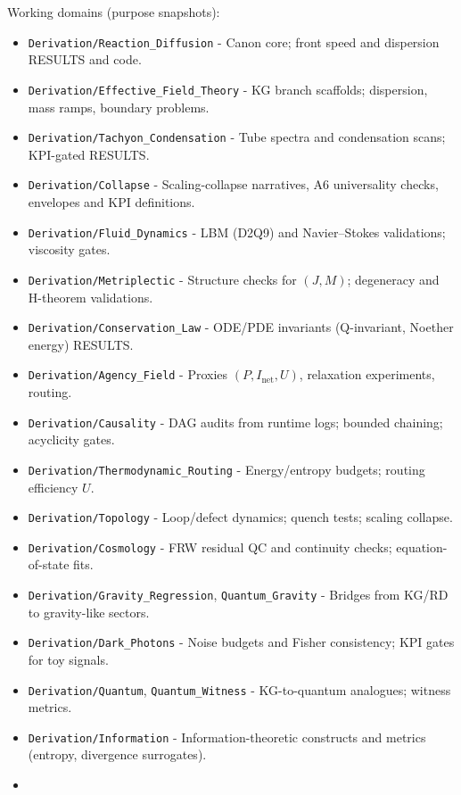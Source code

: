 \documentclass[
]{article}
\providecommand{\tightlist}{%
  \setlength{\itemsep}{0pt}\setlength{\parskip}{0pt}}
\begin{document}
Working domains (purpose snapshots):

\begin{itemize}
\tightlist
\item
  \texttt{Derivation/Reaction\_Diffusion} - Canon core; front speed and
  dispersion RESULTS and code.
\item
  \texttt{Derivation/Effective\_Field\_Theory} - KG branch scaffolds;
  dispersion, mass ramps, boundary problems.
\item
  \texttt{Derivation/Tachyon\_Condensation} - Tube spectra and
  condensation scans; KPI-gated RESULTS.
\item
  \texttt{Derivation/Collapse} - Scaling-collapse narratives, A6
  universality checks, envelopes and KPI definitions.
\item
  \texttt{Derivation/Fluid\_Dynamics} - LBM (D2Q9) and Navier--Stokes
  validations; viscosity gates.
\item
  \texttt{Derivation/Metriplectic} - Structure checks for \((J,M)\);
  degeneracy and H-theorem validations.
\item
  \texttt{Derivation/Conservation\_Law} - ODE/PDE invariants
  (Q-invariant, Noether energy) RESULTS.
\item
  \texttt{Derivation/Agency\_Field} - Proxies
  \((P, I_{\mathrm{net}}, U)\), relaxation experiments, routing.
\item
  \texttt{Derivation/Causality} - DAG audits from runtime logs; bounded
  chaining; acyclicity gates.
\item
  \texttt{Derivation/Thermodynamic\_Routing} - Energy/entropy budgets;
  routing efficiency \(U\).
\item
  \texttt{Derivation/Topology} - Loop/defect dynamics; quench tests;
  scaling collapse.
\item
  \texttt{Derivation/Cosmology} - FRW residual QC and continuity checks;
  equation-of-state fits.
\item
  \texttt{Derivation/Gravity\_Regression}, \texttt{Quantum\_Gravity} -
  Bridges from KG/RD to gravity-like sectors.
\item
  \texttt{Derivation/Dark\_Photons} - Noise budgets and Fisher
  consistency; KPI gates for toy signals.
\item
  \texttt{Derivation/Quantum}, \texttt{Quantum\_Witness} - KG-to-quantum
  analogues; witness metrics.
\item
  \texttt{Derivation/Information} - Information-theoretic constructs and
  metrics (entropy, divergence surrogates).
\item

\end{itemize}
\end{document}
